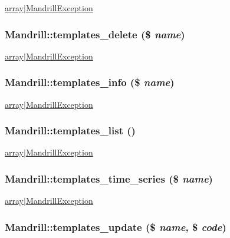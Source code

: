 \label{classMandrill_ab42ad92f550edc23e11fcdc79c8b8ab6}
\hyperlink{}{array$|$MandrillException }\hypertarget{classMandrill_afcb53163cbbd1cf0b182e2f0ac7e993f}{
\subsubsection[{templates\_\-delete}]{\setlength{\rightskip}{0pt plus 5cm}Mandrill::templates\_\-delete (\$ {\em name})}}
\label{classMandrill_afcb53163cbbd1cf0b182e2f0ac7e993f}
\hyperlink{}{array$|$MandrillException }\hypertarget{classMandrill_afe7c0153786a77945db3331cdaee3db2}{
\subsubsection[{templates\_\-info}]{\setlength{\rightskip}{0pt plus 5cm}Mandrill::templates\_\-info (\$ {\em name})}}
\label{classMandrill_afe7c0153786a77945db3331cdaee3db2}
\hyperlink{}{array$|$MandrillException }\hypertarget{classMandrill_a595fb6cd72a0d7140a31067817edfbc9}{
\subsubsection[{templates\_\-list}]{\setlength{\rightskip}{0pt plus 5cm}Mandrill::templates\_\-list ()}}
\label{classMandrill_a595fb6cd72a0d7140a31067817edfbc9}
\hyperlink{}{array$|$MandrillException }\hypertarget{classMandrill_a50e66f854b7a2288c47bcdeb5a53838d}{
\subsubsection[{templates\_\-time\_\-series}]{\setlength{\rightskip}{0pt plus 5cm}Mandrill::templates\_\-time\_\-series (\$ {\em name})}}
\label{classMandrill_a50e66f854b7a2288c47bcdeb5a53838d}
\hyperlink{}{array$|$MandrillException }\hypertarget{classMandrill_af70d4c7550167020579323e6162a1085}{
\subsubsection[{templates\_\-update}]{\setlength{\rightskip}{0pt plus 5cm}Mandrill::templates\_\-update (\$ {\em name}, \/  \$ {\em code})}}
